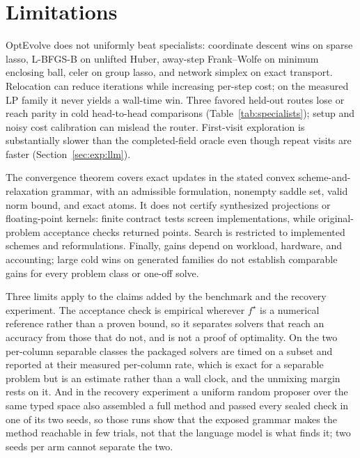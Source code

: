 \section{Limitations}
\label{sec:limitations}

OptEvolve does not uniformly beat specialists: coordinate descent wins on sparse lasso, L-BFGS-B on unlifted Huber, away-step Frank--Wolfe on minimum enclosing ball, celer on group lasso, and network simplex on exact transport. Relocation can reduce iterations while increasing per-step cost; on the measured LP family it never yields a wall-time win. Three favored held-out routes lose or reach parity in cold head-to-head comparisons (Table~\ref{tab:specialists}); setup and noisy cost calibration can mislead the router. First-visit exploration is substantially slower than the completed-field oracle even though repeat visits are faster (Section~\ref{sec:exp:llm}).

The convergence theorem covers exact updates in the stated convex scheme-and-relaxation grammar, with an admissible formulation, nonempty saddle set, valid norm bound, and exact atoms. It does not certify synthesized projections or floating-point kernels: finite contract tests screen implementations, while original-problem acceptance checks returned points. Search is restricted to implemented schemes and reformulations. Finally, gains depend on workload, hardware, and accounting; large cold wins on generated families do not establish comparable gains for every problem class or one-off solve.

Three limits apply to the claims added by the benchmark and the recovery experiment. The acceptance check is empirical wherever $f^\star$ is a numerical reference rather than a proven bound, so it separates solvers that reach an accuracy from those that do not, and is not a proof of optimality. On the two per-column separable classes the packaged solvers are timed on a subset and reported at their measured per-column rate, which is exact for a separable problem but is an estimate rather than a wall clock, and the unmixing margin rests on it. And in the recovery experiment a uniform random proposer over the same typed space also assembled a full method and passed every sealed check in one of its two seeds, so those runs show that the exposed grammar makes the method reachable in few trials, not that the language model is what finds it; two seeds per arm cannot separate the two.
